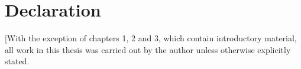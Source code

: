 \chapter{Declaration}

[With the exception of chapters 1, 2 and 3, which contain introductory material, all work in this thesis was carried out by the author unless otherwise explicitly stated.
